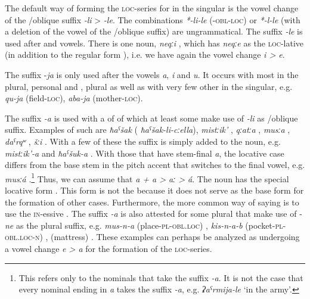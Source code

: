 The default way of forming the \textsc{loc}-series for  in the singular is the vowel change of the \slash oblique suffix \textit{-li} > \textit{-le}. The combinations \textit{*-li-le} \linebreak (\textsc{-obl-loc}) or \textit{*-l-le} (with a deletion of the vowel of the  \slash oblique suffix) are ungrammatical. The suffix \textit{-le} is used after  and vowels. There is one noun, \textit{neqːi} , which has \textit{neqːe} as the \textsc{loc}-lative (in addition to the regular form ), i.e. we have again the vowel change \textit{i > e}. 

The suffix -\textit{ja} is only used after the vowels \textit{a}, \textit{i} and \textit{u}. It occurs with most  in the plural, personal and , plural  as well as with very few other  in the singular, e.g. \textit{qu-ja} (field-\textsc{loc}), \textit{aba-ja} (mother-\textsc{loc}). 

The suffix \textit{-a} is used with a  of  of which at least some make use of \textit{-li} as \slash oblique suffix. Examples of such  are \textit{ħaˁšak}   ( \textit{ħaˁšak-li-cːella}), \textit{mistːik'} , \textit{qːatːa} , \textit{musːa} , \textit{daˁrqʷ} , \textit{šːi} . With a few of these  the suffix is simply added to the noun, e.g. \textit{mistːik'-a}  and \textit{ħaˁšuk-a} . With those  that have stem-final \textit{a}, the locative case differs from the base stem in the pitch accent that switches to the final vowel, e.g. \textit{musːá}  .\footnote{This refers only to the nominals that take the suffix \textit{-a}. It is not the case that every nominal ending in \textit{a} takes the suffix \textit{-a}, e.g. \textit{ʡaˁrmija-le} `in the army'.} Thus, we can assume that \textit{a + a > aː > á}. The noun  has the special locative form  . This form is not the  because it does not serve as the base form for the formation of other cases. Furthermore, the more common way of saying  is to use the \textsc{in}-essive . The suffix \textit{-a} is also attested for some plural  that make use of -\textit{ne} as the plural suffix, e.g. \textit{mus-n-a} (place-\textsc{pl}-\textsc{obl}.\textsc{loc}) , \textit{kis-n-a-b} (pocket-\textsc{pl}-\textsc{obl}.\textsc{loc}-\textsc{n}) ,  (mattress) . These examples can perhaps be analyzed as undergoing a vowel change \textit{e > a} for the formation of the \textsc{loc}-series.

